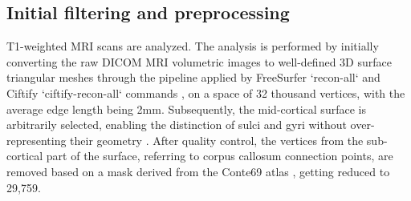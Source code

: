 \subsection{Initial filtering and preprocessing}
\label{subsec:pheno_preproc}
T1-weighted MRI scans are analyzed. The analysis is performed by initially converting the raw DICOM MRI volumetric images to well-defined 3D surface triangular meshes through the pipeline applied by FreeSurfer `recon-all` \cite{Reuter2012} and Ciftify `ciftify-recon-all` commands \cite{Dickie2019}, on a space of 32 thousand vertices, with the average edge length being 2mm. Subsequently, the mid-cortical surface is arbitrarily selected, enabling the distinction of sulci and gyri without over-representing their geometry \cite{Naqvi2021}. After quality control,  the vertices from the sub-cortical part of the surface, referring to corpus callosum connection points, are removed based on a mask derived from the Conte69 atlas \cite{Glasser2011}, getting reduced to 29,759.

